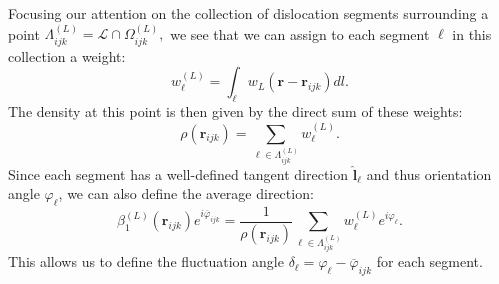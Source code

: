 Focusing our attention on the collection of dislocation segments
surrounding a point
\(\Lambda_{ijk\ }^{(L)}=\mathcal{L}\cap\Omega_{ijk}^{(L)},\) we see
that we can assign to each segment \(\ell\) in this collection a
weight:
\begin{equation}
w_{\ell}^{(L)} = \int_{\ell}^{}{w_{L}\left( \boldsymbol{r -}\boldsymbol{r}_{ijk} \right)dl}.
\end{equation}
The density at this point is then given by the direct sum of these
weights:
\begin{equation}
\rho\left( \boldsymbol{r}_{ijk} \right)=\sum_{ \ell\in\Lambda_{ijk}^{(L)}}^{}w_{\ell}^{(L)}.
\end{equation}
Since each segment has a well-defined tangent direction
\({\hat{\boldsymbol{l}}}_{\ell}\) and thus orientation angle
\(\varphi_{\ell}\), we can
also define the average direction:
\begin{equation}
\beta_{1}^{(L)}\left( \boldsymbol{r}_{ijk} \right)e^{i{\overline{\varphi}}_{ijk}} = \frac{1}{\rho\left( \boldsymbol{r}_{ijk} \right)}\sum_{\ell \in \Lambda_{ijk}^{(L)}}^{}{w_{\ell}^{(L)}e^{i\varphi_{\ell}}}.
\end{equation}
This allows us to define the fluctuation angle
\(\delta_{\ell} = \varphi_{\ell} - {\overline{\varphi}}_{ijk}\)
for each segment.

